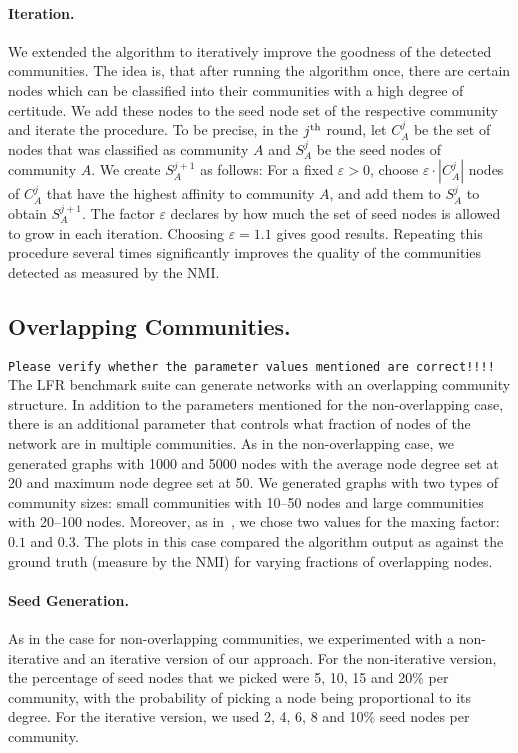 \paragraph{Iteration.}
We extended the algorithm to iteratively improve the goodness of the detected communities.
The idea is, that after running the algorithm once, there are certain nodes which can be classified 
into their communities with a high degree of certitude. We add these nodes to the seed node 
set of the respective community and iterate the procedure. To be precise, in the $j^{\textrm{th}}$ round, 
let $C^j_A$ be the set of nodes that was classified as community $A$ and $S^j_A$ 
be the seed nodes of community $A$. We create $S^{j+1}_A$ as follows: For a fixed $\varepsilon > 0$, 
choose $\varepsilon \cdot |C^j_A|$ nodes of $C^j_A$ that have the highest affinity to community $A$, 
and add them to $S^j_A$ to obtain $S^{j + 1}_A$. 
The factor $\varepsilon$ declares by how much the set of seed nodes is allowed to grow in each iteration. 
Choosing $\varepsilon = 1.1$ gives good results. Repeating this procedure several times significantly 
		improves the quality of the communities detected as measured by the NMI.

\subsection{Overlapping Communities.}
\texttt{Please verify whether the parameter values mentioned are correct!!!!}
The LFR benchmark suite can generate networks with an overlapping community structure. 
In addition to the parameters mentioned for the non-overlapping case, there is an additional 
parameter that controls what fraction of nodes of the network are in multiple communities. 
As in the non-overlapping case, we generated graphs with 1000 and 5000 nodes with the average
node degree set at 20 and maximum node degree set at 50. We generated graphs with two types 
of community sizes: small communities with 10--50 nodes and large communities with 20--100 nodes.
Moreover, as in~\cite{LF09}, we chose two values for the maxing factor: $0.1$ and $0.3$. 
The plots in this case compared the algorithm output as against the ground truth (measure by 
the NMI) for varying fractions of overlapping nodes. 

\paragraph{Seed Generation.}
As in the case for non-overlapping communities, we experimented with a non-iterative 
and an iterative version of our approach. For the non-iterative version, the percentage 
of seed nodes that we picked were 5, 10, 15 and 20$\%$ per community, with the probability
of picking a node being proportional to its degree. For the iterative version, we used 
2, 4, 6, 8 and 10$\%$ seed nodes per community. 

